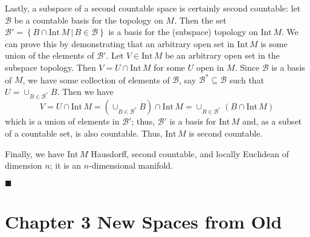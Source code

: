 \documentclass[12pt]{article}
\renewcommand{\qed}{\hfill$\blacksquare$}
\renewenvironment{proof}{\begin{addmargin}[1em]{0em}\begin{newproof}}{\end{newproof}\end{addmargin}\qed}
\begin{document}
\begin{proof}
Lastly, a subspace of a second countable space is certainly second countable: let $\mathcal{B}$ be a countable basis for the topology on $M$. Then the set $\mathcal{B}' = \left\{ B\cap \text{Int}\,M \, | \, B \in \mathcal{B} \right\}$ is a basis for the (subspace) topology on $\text{Int}\,M$. We can prove this by demonstrating that an arbitrary open set in $\text{Int}\,M$ is some union of the elements of $\mathcal{B}'$. Let $V\in \text{Int}\,M$ be an arbitrary open set in the subspace topology. Then $V = U \cap \text{Int}\,M$ for some $U$ open in $M$.  Since $\mathcal{B}$ is a basis of $M$, we have some collection of elements of $\mathcal{B}$, say $\mathcal{B}^*\subseteq \mathcal{B}$ such that $U = \cup_{B \in \mathcal{B}^*}B$. Then we have $$ V = U \cap \text{Int}\,M = \left(\cup_{B\in \mathcal{B}^*} B\right) \cap \text{Int}\,M = \cup_{B \in \mathcal{B}^*} \left(B\cap \text{Int}\,M\right) $$ which is a union of elements in $\mathcal{B}'$; thus, $\mathcal{B}'$ is a basis for $\text{Int}\,M$ and, as a subset of a countable set, is also countable. Thus, $\text{Int}\,M$ is second countable.

Finally, we have $\text{Int}\,M$ Hausdorff, second countable, and locally Euclidean of dimension $n$; it is an $n$-dimensional manifold.

\end{proof}















\newpage
\section*{Chapter 3 New Spaces from Old}
\end{document}
